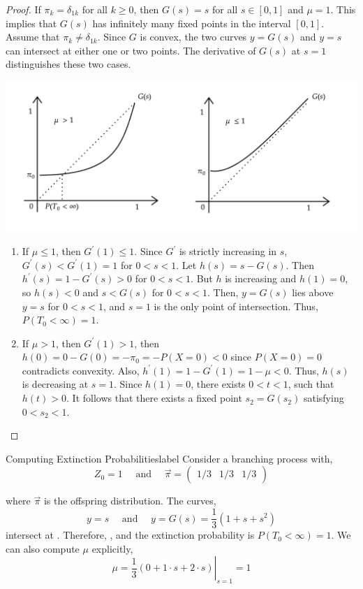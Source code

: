 \documentclass{tufte-handout}
\begin{document}
\begin{proof}
  If $\pi_k = \delta_{1k}$ for all $k \geq 0$, then $G(s) = s$ for all $s \in [0,1]$ and $\mu = 1$. This implies that $G(s)$ has infinitely many fixed points in the interval $[0,1]$. Assume that $\pi_k \neq \delta_{1k}$. Since $G$ is convex, the two curves $y = G(s)$ and $y = s$ can intersect at either one or two points. The derivative of $G(s)$ at $s = 1$ distinguishes these two cases.
    \begin{center}
    \includegraphics[width=\textwidth]{fig-17.png}
    \end{center}
  \begin{enumerate}
    \item If $\mu \leq 1$, then $G^{\prime}(1) \leq 1$. Since $G^{\prime}$ is strictly increasing in $s$, $G^{\prime}(s)<G^{\prime}(1)=1$ for $0 < s < 1$. Let $h(s) = s - G(s)$. Then $h^{\prime}(s) = 1 -G^{\prime}(s) > 0$ for $0 < s < 1$. But $h$ is increasing and $h(1) = 0$, so $h(s) < 0$ and $s < G(s)$ for $0 < s < 1$. Then, $y = G(s)$ lies above $y = s$ for $0 < s < 1$, and $s = 1$ is the only point of intersection. Thus, $P(T_0 < \infty) = 1$.
    \item If $\mu > 1$, then $G^{\prime}(1) > 1$, then $h(0) = 0 - G(0) = -\pi_0 = -P(X = 0) < 0$ since $P(X = 0) = 0$ contradicts convexity. Also, $h^{\prime}(1) = 1 - G^{\prime}(1) = 1 - \mu < 0$. Thus, $h(s)$ is decreasing at $s = 1$. Since $h(1) = 0$, there exists $0 < t < 1$, such that $h(t) > 0$. It follows that there exists a fixed point $s_2 = G(s_2)$ satisfying $0 < s_2 < 1$. 
  \end{enumerate}
\end{proof}

\begin{ex}{Computing Extinction Probabilities}{label}
  Consider a branching process with,
  \[Z_0 = 1 \quad \text{ and } \quad \Vec{\pi} = \begin{pmatrix} 1/3 & 1/3 & 1/3\end{pmatrix}\]

  where $\Vec{\pi}$ is the offspring distribution. The curves,
  \[y = s \quad \text{ and } \quad y = G(s) = \frac{1}{3}(1 + s + s^2)\]
  \noindent intersect at . Therefore, , and the extinction probability is $P(T_0 < \infty) = 1$. We can also compute $\mu$ explicitly,
  \[\mu=\left.\frac{1}{3}(0+1 \cdot s + 2 \cdot s)\right|_{s=1}=1\]
\end{ex}
\end{document}
